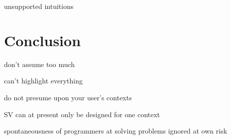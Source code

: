 \documentclass[11pt, a4paper, ngerman, twoside]{article}
\theoremstyle{plain}\newtheorem{Lemma}{Lemma}
\theoremstyle{plain}\newtheorem{Satz}[Lemma]{Satz}
\theoremstyle{definition}\newtheorem{Definition}[Lemma]{Definition}
\theoremstyle{definition}\newtheorem*{Beispiel}{Beispiel}
\theoremstyle{remark}\newtheorem*{Bemerkung}{Bemerkung}
\begin{document}
unsupported intuitions

\section{Conclusion}

don’t assume too much

can’t highlight everything

do not presume upon your user’s contexts

SV can at present only be designed for one context

spontaneousness of programmers at solving problems ignored at own risk



\end{document}
